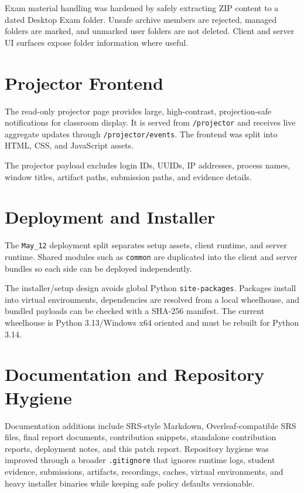 \documentclass[conference]{IEEEtran}
\begin{document}
Exam material handling was hardened by safely extracting ZIP content to a dated Desktop Exam folder. Unsafe archive members are rejected, managed folders are marked, and unmarked user folders are not deleted. Client and server UI surfaces expose folder information where useful.

\section{Projector Frontend}

The read-only projector page provides large, high-contrast, projection-safe notifications for classroom display. It is served from \texttt{/projector} and receives live aggregate updates through \texttt{/projector/events}. The frontend was split into HTML, CSS, and JavaScript assets.

The projector payload excludes login IDs, UUIDs, IP addresses, process names, window titles, artifact paths, submission paths, and evidence details.

\section{Deployment and Installer}

The \texttt{May\_12} deployment split separates setup assets, client runtime, and server runtime. Shared modules such as \texttt{common} are duplicated into the client and server bundles so each side can be deployed independently.

The installer/setup design avoids global Python \texttt{site-packages}. Packages install into virtual environments, dependencies are resolved from a local wheelhouse, and bundled payloads can be checked with a SHA-256 manifest. The current wheelhouse is Python 3.13/Windows x64 oriented and must be rebuilt for Python 3.14.

\section{Documentation and Repository Hygiene}

Documentation additions include SRS-style Markdown, Overleaf-compatible SRS files, final report documents, contribution snippets, standalone contribution reports, deployment notes, and this patch report. Repository hygiene was improved through a broader \texttt{.gitignore} that ignores runtime logs, student evidence, submissions, artifacts, recordings, caches, virtual environments, and heavy installer binaries while keeping safe policy defaults versionable.
\end{document}
